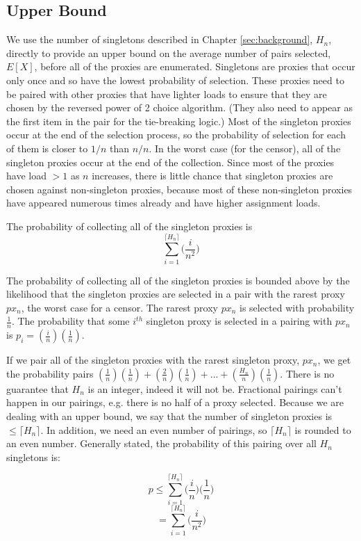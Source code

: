 \subsection{Upper Bound}  

We use the number of singletons described in Chapter \ref{sec:background}, $H_n$, directly to provide an upper bound on the average number of pairs selected, $E[X]$, before all of the proxies are enumerated. Singletons are proxies that occur only once and so have the lowest probability of selection. These proxies need to be paired with other proxies that have lighter loads to ensure that they are chosen by the reversed power of 2 choice algorithm. (They also need to appear as the first item in the pair for the tie-breaking logic.) Most of the singleton proxies occur at the end of the selection process, so the probability of selection for each of them is closer to $1/n$ than $n/n$. In the worst case (for the censor), all of the singleton proxies occur at the end of the collection. Since most of the proxies have load $> 1$ as $n$ increases, there is little chance that singleton proxies are chosen against non-singleton proxies, because most of these non-singleton proxies have appeared numerous times already and have higher assignment loads.

\begin{lemma}{The probability of collecting all of the singleton proxies is \\
$$\sum_{i=1}^{\lceil{H_n}\rceil} \bigg(\frac{i}{n^2}\bigg)$$}

The probability of collecting all of the singleton proxies is bounded above by the likelihood that the singleton proxies are selected in a pair with the rarest proxy $px_n$, the worst case for a censor. The rarest proxy $px_n$ is selected with probability $\frac{1}{n}$. The probability that some $i^{th}$ singleton proxy is selected in a pairing with $px_n$ is $p_i = (\frac{i}{n})(\frac{1}{n})$. 

If we pair all of the singleton proxies with the rarest singleton proxy, $px_n$, we get the probability pairs $(\frac{1}{n})(\frac{1}{n}) + (\frac{2}{n})(\frac{1}{n}) + ... + (\frac{H_n}{n})(\frac{1}{n})$. There is no guarantee that $H_n$ is an integer, indeed it will not be. Fractional pairings can't happen in our pairings, e.g. there is no half of a proxy selected. Because we are dealing with an upper bound, we say that the number of singleton proxies is $\leq \lceil{H_n}\rceil$. In addition, we need an even number of pairings, so $\lceil{H_n}\rceil$ is rounded to an even number. Generally stated, the probability of this pairing over all $H_n$ singletons is:

$$p \leq \sum_{i=1}^{\lceil{H_n}\rceil} \bigg(\frac{i}{n}\bigg) \bigg(\frac{1}{n}\bigg)$$
$$= \sum_{i=1}^{\lceil{H_n}\rceil} \bigg(\frac{i}{n^2}\bigg)$$

\end{lemma}

